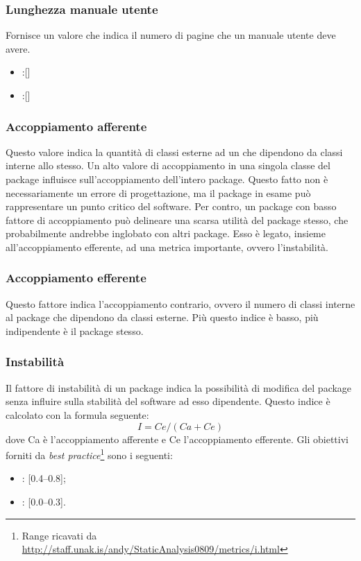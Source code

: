 \subsubsection{Lunghezza manuale utente}
Fornisce un valore che indica il numero di pagine che un manuale utente deve avere.
\begin{itemize}
\item {}:[]
\item {}:[]
\end{itemize}

\subsubsection{Accoppiamento afferente}
Questo valore indica la quantità di classi esterne ad un  che dipendono da classi interne allo stesso.
Un alto valore di accoppiamento in una singola classe del package influisce sull'accoppiamento dell'intero package. Questo fatto non è necessariamente un errore di progettazione, ma il package in esame può rappresentare un punto critico del software. Per contro, un package con basso fattore di accoppiamento può delineare una scarsa utilità del package stesso, che probabilmente andrebbe inglobato con altri package. Esso è legato, insieme all'accoppiamento efferente, ad una metrica importante, ovvero l'instabilità.

\subsubsection{Accoppiamento efferente}
Questo fattore indica l'accoppiamento contrario, ovvero il numero di classi interne al package che dipendono da classi esterne. Più questo indice è basso, più indipendente è il package stesso.

\subsubsection{Instabilità}
\label{4.2.8}
Il fattore di instabilità di un package indica la possibilità di modifica del package senza influire sulla stabilità del software ad esso dipendente.
Questo indice è calcolato con la formula seguente:
$$I = Ce / (Ca + Ce)$$
dove Ca è l'accoppiamento afferente e Ce l'accoppiamento efferente.
Gli obiettivi forniti da \emph{best practice}\footnote{Range ricavati da \url{http://staff.unak.is/andy/StaticAnalysis0809/metrics/i.html}} sono i seguenti:
\begin{itemize}
\item {}: [0.4--0.8];
\item {}: [0.0--0.3].
\end{itemize}

